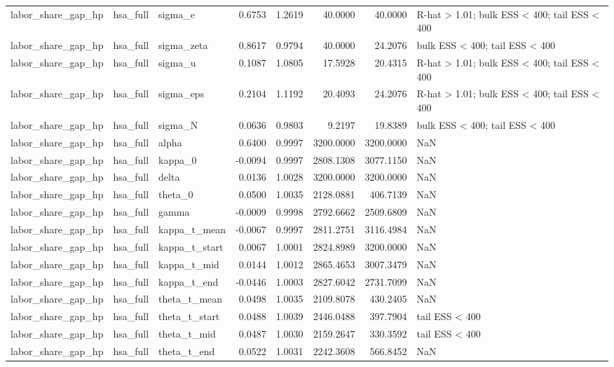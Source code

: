 \begin{tabular}{lllrrrrl}
labor\_share\_gap\_hp & hsa\_full & sigma\_e & 0.6753 & 1.2619 & 40.0000 & 40.0000 & R-hat > 1.01; bulk ESS < 400; tail ESS < 400 \\
labor\_share\_gap\_hp & hsa\_full & sigma\_zeta & 0.8617 & 0.9794 & 40.0000 & 24.2076 & bulk ESS < 400; tail ESS < 400 \\
labor\_share\_gap\_hp & hsa\_full & sigma\_u & 0.1087 & 1.0805 & 17.5928 & 20.4315 & R-hat > 1.01; bulk ESS < 400; tail ESS < 400 \\
labor\_share\_gap\_hp & hsa\_full & sigma\_eps & 0.2104 & 1.1192 & 20.4093 & 24.2076 & R-hat > 1.01; bulk ESS < 400; tail ESS < 400 \\
labor\_share\_gap\_hp & hsa\_full & sigma\_N & 0.0636 & 0.9803 & 9.2197 & 19.8389 & bulk ESS < 400; tail ESS < 400 \\
labor\_share\_gap\_hp & hsa\_full & alpha & 0.6400 & 0.9997 & 3200.0000 & 3200.0000 & NaN \\
labor\_share\_gap\_hp & hsa\_full & kappa\_0 & -0.0094 & 0.9997 & 2808.1308 & 3077.1150 & NaN \\
labor\_share\_gap\_hp & hsa\_full & delta & 0.0136 & 1.0028 & 3200.0000 & 3200.0000 & NaN \\
labor\_share\_gap\_hp & hsa\_full & theta\_0 & 0.0500 & 1.0035 & 2128.0881 & 406.7139 & NaN \\
labor\_share\_gap\_hp & hsa\_full & gamma & -0.0009 & 0.9998 & 2792.6662 & 2509.6809 & NaN \\
labor\_share\_gap\_hp & hsa\_full & kappa\_t\_mean & -0.0067 & 0.9997 & 2811.2751 & 3116.4984 & NaN \\
labor\_share\_gap\_hp & hsa\_full & kappa\_t\_start & 0.0067 & 1.0001 & 2824.8989 & 3200.0000 & NaN \\
labor\_share\_gap\_hp & hsa\_full & kappa\_t\_mid & 0.0144 & 1.0012 & 2865.4653 & 3007.3479 & NaN \\
labor\_share\_gap\_hp & hsa\_full & kappa\_t\_end & -0.0446 & 1.0003 & 2827.6042 & 2731.7099 & NaN \\
labor\_share\_gap\_hp & hsa\_full & theta\_t\_mean & 0.0498 & 1.0035 & 2109.8078 & 430.2405 & NaN \\
labor\_share\_gap\_hp & hsa\_full & theta\_t\_start & 0.0488 & 1.0039 & 2446.0488 & 397.7904 & tail ESS < 400 \\
labor\_share\_gap\_hp & hsa\_full & theta\_t\_mid & 0.0487 & 1.0030 & 2159.2647 & 330.3592 & tail ESS < 400 \\
labor\_share\_gap\_hp & hsa\_full & theta\_t\_end & 0.0522 & 1.0031 & 2242.3608 & 566.8452 & NaN \\

\end{tabular}
